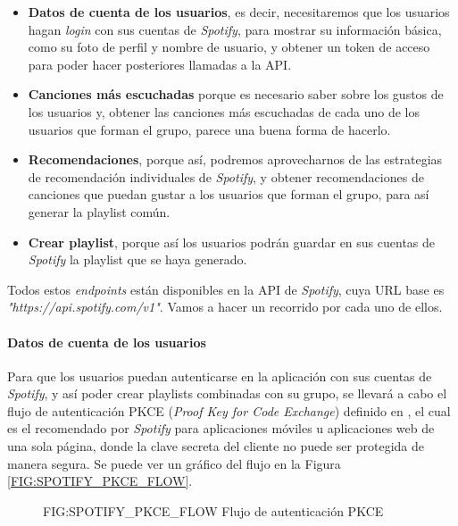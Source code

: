 \begin{itemize}
  \item \textbf{Datos de cuenta de los usuarios}, es decir, necesitaremos que los usuarios hagan 
  \textit{login} con sus cuentas de \textit{Spotify}, para mostrar su información básica, como su foto de
   perfil y nombre de usuario, y obtener un token de acceso para poder hacer posteriores llamadas a la API.
  \item \textbf{Canciones más escuchadas} porque es necesario saber sobre los gustos de los usuarios y,
  obtener las canciones más escuchadas de cada uno de los usuarios que forman el grupo, parece una buena forma de hacerlo.
  \item \textbf{Recomendaciones}, porque así, podremos aprovecharnos de las estrategias de recomendación 
  individuales de \textit{Spotify}, y obtener recomendaciones de canciones que puedan gustar a los usuarios 
  que forman el grupo, para así generar la playlist común.
  \item \textbf{Crear playlist}, porque así los usuarios podrán guardar en sus cuentas de \textit{Spotify} la
  playlist que se haya generado.
\end{itemize}

Todos estos \textit{endpoints} están disponibles en la API de \textit{Spotify}, cuya URL base es \textit{"https://api.spotify.com/v1"}. 
Vamos a hacer un recorrido por cada uno de ellos.

\paragraph{Datos de cuenta de los usuarios\label{subsec:datos_cuenta_usuarios}}

Para que los usuarios puedan autenticarse en la aplicación con sus cuentas de \textit{Spotify}, y así poder crear playlists 
combinadas con su grupo, se llevará a cabo el flujo de autenticación PKCE 
(\textit{Proof Key for Code Exchange}) definido en \cite{spotify_pkce}, el cual es el recomendado por 
\textit{Spotify} para aplicaciones móviles u aplicaciones web de una sola página, donde la clave secreta
del cliente no puede ser protegida de manera segura. Se puede ver un gráfico del flujo en la Figura \ref{FIG:SPOTIFY_PKCE_FLOW}.

\begin{figure}[Flujo de autenticación PKCE]{FIG:SPOTIFY_PKCE_FLOW}
    {Flujo de autenticación PKCE}
\end{figure}

